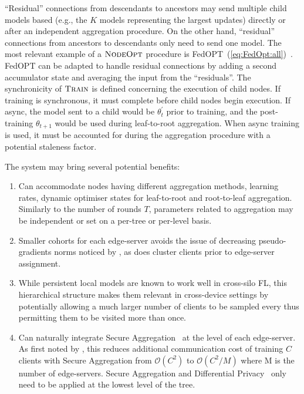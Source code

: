 ``Residual'' connections from descendants to ancestors may send multiple child models based (e.g., the $K$ models representing the largest updates) directly or after an independent aggregation procedure. On the other hand, ``residual'' connections from ancestors to descendants only need to send one model. The most relevant example of a $\textsc{NodeOpt}$ procedure is FedOPT~(\cref{eq:FedOpt:all})~\citep{FedOPT}. FedOPT can be adapted to handle residual connections by adding a second accumulator state and averaging the input from the ``residuals''. The synchronicity of $\textsc{Train}$ is defined concerning the execution of child nodes. If training is synchronous, it must complete before child nodes begin execution. If async, the model sent to a child would be $\theta_{t}^\prime$ prior to training, and the post-training $\theta_{t+1}$ would be used during leaf-to-root aggregation. When async training is used, it must be accounted for during the aggregation procedure with a potential staleness factor.

The system may bring several potential benefits:
\begin{enumerate}
    \item Can accommodate nodes having different aggregation methods, learning rates, dynamic optimiser states for leaf-to-root and root-to-leaf aggregation. Similarly to the number of rounds $T$, parameters related to aggregation may be independent or set on a per-tree or per-level basis.
    \item Smaller cohorts for each edge-server avoids the issue of decreasing pseudo-gradients norms noticed by \citet{LargeCohorts}, as does cluster clients prior to edge-server assignment.
    \item While persistent local models are known to work well in cross-silo FL, this hierarchical structure makes them relevant in cross-device settings by potentially allowing a much larger number of clients to be sampled every thus permitting them to be visited more than once.
    \item Can naturally integrate Secure Aggregation~\citep{SecAggOG,FastSecAgg} at the level of each edge-server. As first noted by \citet{ScaleSystemDesign}, this reduces additional communication cost of training $C$ clients with Secure Aggregation from $\mathcal{O}(C^2)$ to $\mathcal{O}(C^2/M)$ where M is the number of edge-servers. Secure Aggregation and Differential Privacy~\citep{DiffPrivacyFL} only need to be applied at the lowest level of the tree.

\end{enumerate}

